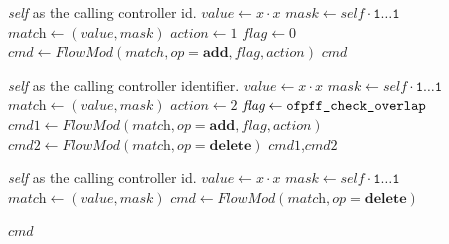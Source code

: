 \documentclass[conference]{sigcomm-alternate}
\newcommand{\concat}[0]{\cdot}
\newcommand{\claimcheck}{check\xspace}
\newcommand{\add}{\textbf{add}\xspace}
\newcommand{\dele}{\textbf{delete}\xspace}
\newcommand{\checko}{\texttt{check\_overlap}\xspace}
\begin{document}
{\small

\begin{algorithm}[t]
    \caption{$\textit{claim}(x)$}
    \label{alg:claim}
    \begin{algorithmic}[1]
    \Require \emph{self} as the calling controller id.
    		\State $\textit{value} \gets x\concat x$
    		\State $\textit{mask} \gets \textit{self}\concat \texttt{1$\ldots$1}$
	    	\State $\textit{match} \gets (\textit{value},\textit{mask})$
    		\State $\textit{action} \gets 1$
    		\State $\textit{flag} \gets 0$
    		\State $\textit{cmd}\gets \textit{FlowMod}(match, op = \add, \textit{flag}, \textit{action}) $
			\Return $\textit{cmd}$
    \end{algorithmic}
\end{algorithm}

\begin{algorithm}[t]
    \caption{$\textit{\claimcheck}(x)$}
    \label{alg:check}
    \begin{algorithmic}[1]
    \Require \emph{self} as the calling controller identifier.
    		\State $\textit{value} \gets x\concat x$
    		\State $\textit{mask} \gets self\concat \texttt{1$\ldots$1}$
    		\State $\textit{match} \gets (value,mask)$
    		\State $\textit{action} \gets 2$
    		\State $\textit{flag} \gets \texttt{ofpff\_\checko}$
    		\State $\textit{cmd1}\gets \textit{FlowMod}(\textit{match}, op = \add, \textit{flag}, \textit{action}) $
    		\State $\textit{cmd2}\gets \textit{FlowMod}(\textit{match}, op = \dele) $
			\Return $\textit{cmd1}$,$\textit{cmd2}$
    \end{algorithmic}
\end{algorithm}

\begin{algorithm}[t]
    \caption{$\textit{unclaim}(x)$}
    \label{alg:unclaim}
    \begin{algorithmic}[1]
    \Require \emph{self} as the calling controller id.
    		\State $\textit{value} \gets x\concat x$
    		\State $\textit{mask} \gets self\concat \texttt{1$\ldots$1}$
    		\State $\textit{match} \gets (\textit{value},\textit{mask})$
    		\State $\textit{cmd}\gets \textit{FlowMod}(\textit{match}, op=\dele) $
    	
			
			\Return $cmd$
    \end{algorithmic}
\end{algorithm}
}
\end{document}
